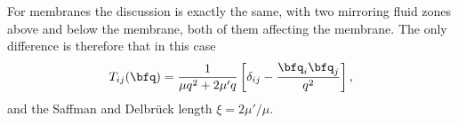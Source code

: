For membranes the discussion is exactly the same, with two mirroring
fluid zones above and below the membrane, both of them affecting the
membrane. The only difference is therefore that in this case
\[
T_{ij}(\bfq) = \frac 1{\mu q^2 +  2 \mu' q  } \left[
  \delta_{ij} - \frac{ \bfq_i  \bfq_j}{q^2} 
\right],
\]
and the Saffman and Delbr{\"u}ck length $\xi = 2 \mu'/\mu$.

